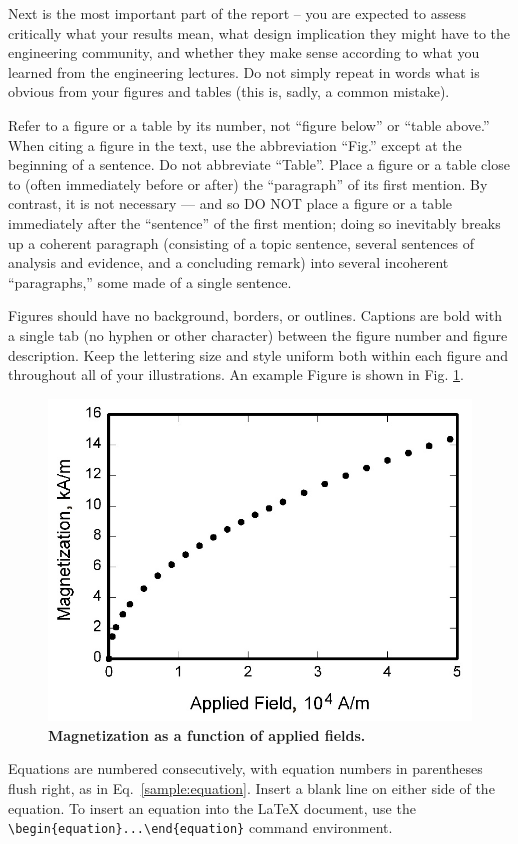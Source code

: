 \documentclass{engr1000j-s2}
\begin{document}
  Next is the most important part of the report – you are expected to assess
  critically what your results mean, what design implication they might have to the
  engineering community, and whether they make sense according to what you
  learned from the engineering lectures. Do not simply repeat in words what is obvious
  from your figures and tables (this is, sadly, a common mistake).

  

  Refer to a figure or a table by its number, not “figure below” or “table above.”
  When citing a figure in the text, use the abbreviation “Fig.” except at the beginning
  of a sentence. Do not abbreviate “Table”. Place a figure or a table close to (often
  immediately before or after) the “paragraph” of its first mention. By contrast,
  it is not necessary --- and so DO NOT place a figure or a table immediately after
  the “sentence” of the first mention; doing so inevitably breaks up a coherent
  paragraph (consisting of a topic sentence, several sentences of analysis and
  evidence, and a concluding remark) into several incoherent “paragraphs,” some
  made of a single sentence.

  Figures should have no background, borders, or outlines. Captions are bold with
  a single tab (no hyphen or other character) between the figure number and figure
  description. Keep the lettering size and style uniform both within each figure
  and throughout all of your illustrations. An example Figure is shown in Fig.
  \ref{fig:graph}.

  \begin{figure}[H]
    \centering
    \includegraphics[width=.5\textwidth]{figures/graph.jpg}
    \caption{\quad \textbf{Magnetization as a function of applied fields.}}
    \label{fig:graph}
  \end{figure}

  Equations are numbered consecutively, with equation numbers in parentheses flush right, as in Eq.~\eqref{sample:equation}. Insert a blank line on either side of the equation. To insert an equation into the \LaTeX{} document, use the \verb|\begin{equation}...\end{equation}| command environment.
\end{document}
